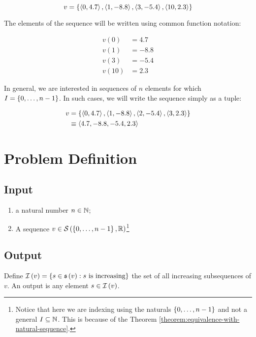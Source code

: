 \begin{equation}
    v = \left\{ 
        \left\langle 0, 4.7 \right\rangle,
        \left\langle 1, -8.8 \right\rangle,
        \left\langle 3, -5.4 \right\rangle,
        \left\langle 10, 2.3 \right\rangle
     \right\}
\end{equation}

The elements of the sequence will be written using common function notation:

\begin{align*}
    v(0) & = 4.7 \\
    v(1) & = -8.8 \\
    v(3) & = -5.4 \\
    v(10) & = 2.3
\end{align*}

In general, we are interested in sequences of $n$ elements for which $I = \left\{ 0, \dots, n-1 \right\}$. In such cases, we will write the sequence simply as a tuple:

\begin{align}
    \nonumber
    v
    & = \left\{ 
        \left\langle 0, 4.7 \right\rangle,
        \left\langle 1, -8.8 \right\rangle,
        \left\langle 2, -5.4 \right\rangle,
        \left\langle 3, 2.3 \right\rangle
         \right\}
    \\
    & \equiv \left\langle 4.7, -8.8, -5.4, 2.3 \right\rangle
\end{align}

\section{Problem Definition}

\subsection{Input}

\begin{enumerate}
    \item a natural number $n \in \mathbb{N}$;
    \item A sequence $v \in \mathcal{S}\left( \left\{ 0, \dots, n-1 \right\}, \mathbb{R} \right)$\footnote{Notice that here we are indexing using the naturals $\left\{ 0, \dots, n-1 \right\}$ and not a general $I \subseteq \mathbb{N}$. This is because of the Theorem \ref{theorem:equivalence-with-natural-sequence}.}
\end{enumerate}

\subsection{Output}

Define $\mathcal{I}\left(v\right) = \left\{  s \in \mathfrak{s}\left(v\right) : s \mbox{ is increasing} \right\}$ the set of all increasing subsequences of $v$. An output is any element $s \in \mathcal{I}\left(v\right)$.

